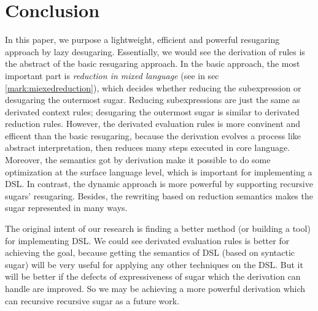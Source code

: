 \section{Conclusion}
\label{sec7}


In this paper, we purpose a lightweight, efficient and powerful resugaring approach by lazy desugaring. Essentially, we would see the derivation of rules is the abstract of the basic resugaring approach. In the basic approach, the most important part is \emph{reduction in mixed language} (see in sec \ref{mark:miexedreduction}), which decides whether reducing the subexpression or desugaring the outermost sugar. Reducing subexpressions are just the same as derivated context rules; desugaring the outermost sugar is similar to derivated reduction rules. However, the derivated evaluation rules is more convinent and efficent than the basic resugaring, because the derivation evolves a process like abstract interpretation\cite{AbstractInterpretation}, then reduces many steps executed in core language. Moreover, the semantics got by derivation make it possible to do some optimization at the surface language level, which is important for implementing a DSL. In contrast, the dynamic approach is more powerful by supporting recursive sugars' resugaring. Besides, the rewriting based on reduction semantics makes the sugar represented in many ways.

The original intent of our research is finding a better method (or building a tool) for implementing DSL. We could see derivated evaluation rules is better for achieving the goal, because getting the semantics of DSL (based on syntactic sugar) will be very useful for applying any other techniques on the DSL. But it will be better if the defects of expressiveness of sugar which the derivation can handle are improved. So we may be achieving a more powerful derivation which can recursive recursive sugar as a future work.
